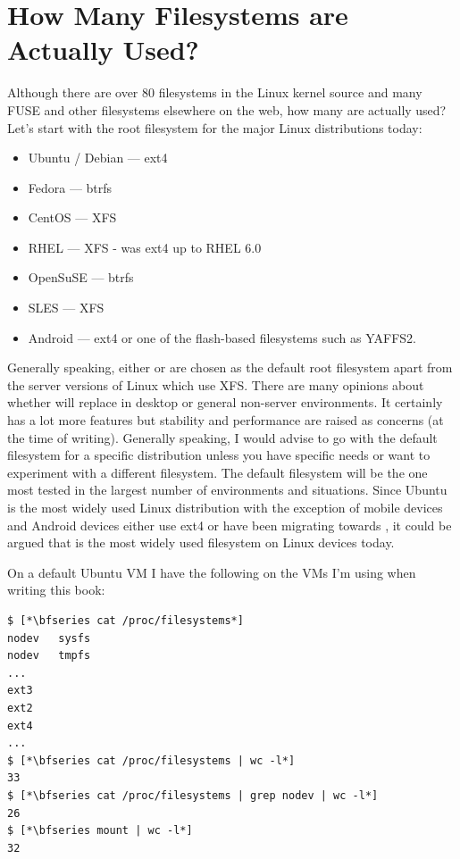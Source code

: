 
\section{How Many Filesystems are Actually Used?}

Although there are over 80 filesystems in the Linux kernel source and many FUSE and other filesystems elsewhere on the web, how many are actually used? Let's start with the root filesystem for the major Linux distributions today:

\begin{itemize}
	\item Ubuntu / Debian --- ext4
	\item Fedora --- btrfs 
	\item CentOS --- XFS
	\item RHEL --- XFS - was ext4 up to RHEL 6.0
	\item OpenSuSE --- btrfs
	\item SLES --- XFS
	\item Android --- ext4 or one of the flash-based filesystems such as YAFFS2. 
\end{itemize}

\noindent
Generally speaking, either  or  are chosen as the default root filesystem apart from the server versions of Linux which use XFS. There are many opinions about whether  will replace  in desktop or general non-server environments. It certainly has a lot more features but stability and performance are raised as concerns (at the time of writing). Generally speaking, I would advise to go with the default filesystem for a specific distribution unless you have specific needs or want to experiment with a different filesystem. The default filesystem will be the one most tested in the largest number of environments and situations. Since Ubuntu is the most widely used Linux distribution with the exception of mobile devices and Android devices either use ext4 or have been migrating towards , it could be argued that  is the most widely used filesystem on Linux devices today.

On a default Ubuntu VM I have the following on the VMs I'm using when writing this book:

\begin{lstlisting}
$ [*\bfseries cat /proc/filesystems*]
nodev	sysfs
nodev	tmpfs
...
ext3
ext2
ext4
...
$ [*\bfseries cat /proc/filesystems | wc -l*]
33
$ [*\bfseries cat /proc/filesystems | grep nodev | wc -l*]
26
$ [*\bfseries mount | wc -l*]
32
\end{lstlisting}

